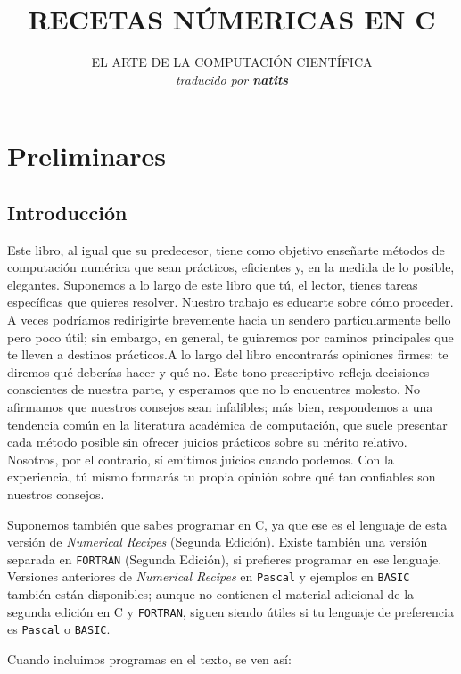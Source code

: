 \documentclass[10pt,a4paper]{book}
\title{\textbf{RECETAS NÚMERICAS EN C}}
\author{EL ARTE DE LA COMPUTACIÓN CIENTÍFICA\\\textit{traducido por \textbf{natits}}}
\date{}
\begin{document}
\maketitle
\newpage
\tableofcontents
\newpage

\chapter{Preliminares}

\section{Introducción}

Este libro, al igual que su predecesor, tiene como objetivo enseñarte métodos de computación numérica que sean prácticos, eficientes y, en la medida de lo posible, elegantes. Suponemos a lo largo de este libro que tú, el lector, tienes tareas específicas que quieres resolver. Nuestro trabajo es educarte sobre cómo proceder. A veces podríamos redirigirte brevemente hacia un sendero particularmente bello pero poco útil; sin embargo, en general, te guiaremos por caminos principales que te lleven a destinos prácticos.A lo largo del libro encontrarás opiniones firmes: te diremos qué deberías hacer y qué no. Este tono prescriptivo refleja decisiones conscientes de nuestra parte, y esperamos que no lo encuentres molesto. No afirmamos que nuestros consejos sean infalibles; más bien, respondemos a una tendencia común en la literatura académica de computación, que suele presentar cada método posible sin ofrecer juicios prácticos sobre su mérito relativo. Nosotros, por el contrario, sí emitimos juicios cuando podemos. Con la experiencia, tú mismo formarás tu propia opinión sobre qué tan confiables son nuestros consejos.

\medskip

Suponemos también que sabes programar en C, ya que ese es el lenguaje de esta versión de \textit{Numerical Recipes} (Segunda Edición). 
Existe también una versión separada en \texttt{FORTRAN} (Segunda Edición), si prefieres programar en ese lenguaje. Versiones anteriores de \textit{Numerical Recipes} en \texttt{Pascal} y ejemplos en \texttt{BASIC} también están disponibles; aunque no contienen el material adicional de la segunda edición en C y \texttt{FORTRAN}, siguen siendo útiles si tu lenguaje de preferencia es \texttt{Pascal} o \texttt{BASIC}.

Cuando incluimos programas en el texto, se ven así:
\end{document}
